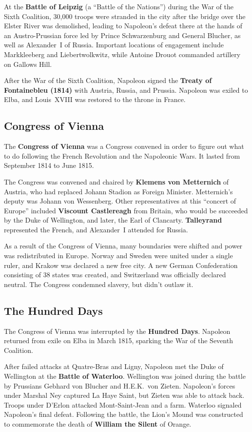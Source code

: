 At the \textbf{Battle of Leipzig} (a ``Battle of the Nations'')
during the War of the Sixth Coalition,
30,000 troops were stranded in the city after the bridge over the Elster River was demolished,
leading to Napoleon's defeat there at the hands of an Austro-Prussian force
led by Prince Schwarzenburg and General Blucher, as well as Alexander~I of Russia.
Important locations of engagement include Markkleeberg and Liebertwolkwitz,
while Antoine Drouot commanded artillery on Gallows Hill.

After the War of the Sixth Coalition,
Napoleon signed the \textbf{Treaty of Fontainebleu (1814)} with Austria, Russia, and Prussia.
Napoleon was exiled to Elba, and Louis~XVIII was restored to the throne in France.

\subsection*{Congress of Vienna}

The \textbf{Congress of Vienna} was a Congress convened in order to figure out what to do
following the French Revolution and the Napoleonic Wars.
It lasted from September 1814 to June 1815.

The Congress was convened and chaired by \textbf{Klemens von Metternich} of Austria,
who had replaced Johann Stadion as Foreign Minister.
Metternich's deputy was Johann von Wessenberg.
Other representatives at this ``concert of Europe'' included
\textbf{Viscount Castlereagh} from Britain,
who would be succeeded by the Duke of Wellington,
and later, the Earl of Clancarty.
\textbf{Talleyrand} represented the French, and Alexander~I attended for Russia.

As a result of the Congress of Vienna,
many boundaries were shifted and power was redistributed in Europe.
Norway and Sweden were united under a single ruler, and Krakow was declared a new free city.
A new German Confederation consisting of 38 states was created,
and Switzerland was officially declared neutral.
The Congress condemned slavery, but didn't outlaw it.

\subsection*{The Hundred Days}

The Congress of Vienna was interrupted by the \textbf{Hundred Days}.
Napoleon returned from exile on Elba in March 1815,
sparking the War of the Seventh Coalition.

After failed attacks at Quatre-Bras and Ligny,
Napoleon met the Duke of Wellington at the \textbf{Battle of Waterloo}.
Wellington was joined during the battle by Prussians Gebhard von Blucher and H.E.K.\ von Zieten.
Napoleon's forces under Marshal Ney captured La Haye Saint, but Zieten was able to attack back.
Troops under D'Erlon attacked Mont-Saint-Jean and a farm.
Waterloo signaled Napoleon's final defeat.
Following the battle,
the Lion's Mound was constructed to commemorate the death of \textbf{William the Silent} of Orange.

